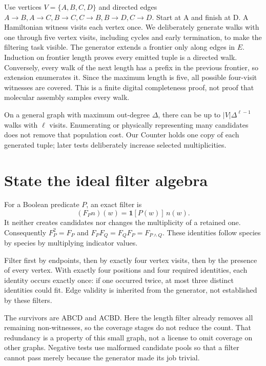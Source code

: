 Use vertices $V=\{A,B,C,D\}$ and directed edges
$A\to B,A\to C,B\to C,C\to B,B\to D,C\to D$.
Start at A and finish at D. A Hamiltonian witness visits each vertex once.
We deliberately generate walks with one through five vertex visits,
including cycles and early termination, to make the filtering task visible.
The generator extends a frontier only along edges in $E$. Induction on
frontier length proves every emitted tuple is a directed walk. Conversely,
every walk of the next length has a prefix in the previous frontier, so
extension enumerates it. Since the maximum length is five, all possible
four-visit witnesses are covered. This is a finite digital completeness
proof, not proof that molecular assembly samples every walk.

On a general graph with maximum out-degree $\Delta$, there can be up to
$|V|\Delta^{\ell-1}$ walks with $\ell$ visits. Enumerating or physically
representing many candidates does not remove that population cost.
Our Counter holds one copy of each generated tuple; later tests deliberately
increase selected multiplicities.

\section{State the ideal filter algebra}
For a Boolean predicate $P$, an exact filter is
\begin{equation}
 (F_Pn)(w)=\mathbf1[P(w)]\,n(w).
\end{equation}
It neither creates candidates nor changes the multiplicity of a retained one.
Consequently $F_P^2=F_P$ and $F_PF_Q=F_QF_P=F_{P\land Q}$.
These identities follow species by species by multiplying indicator values.

Filter first by endpoints, then by exactly four vertex visits, then by
the presence of every vertex. With exactly four positions and four required
identities, each identity occurs exactly once: if one occurred twice,
at most three distinct identities could fit. Edge validity is inherited
from the generator, not established by these filters.
\begin{center}\end{center}
The survivors are ABCD and ACBD. Here the length filter already removes all
remaining non-witnesses, so the coverage stages do not reduce the count.
That redundancy is a property of this small graph, not a license to omit
coverage on other graphs. Negative tests use malformed candidate pools so
that a filter cannot pass merely because the generator made its job trivial.

